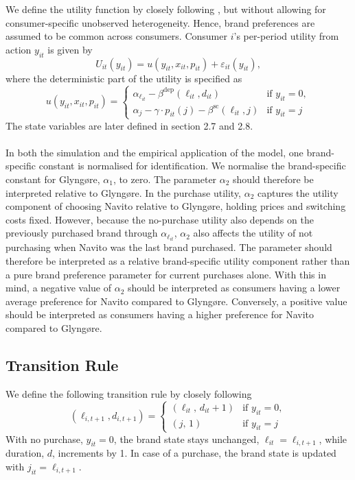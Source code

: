 We define the utility function by closely following \cite{Agu2023}, but without allowing for consumer-specific unobserved heterogeneity. Hence, brand preferences are assumed to be common across consumers. Consumer $i$'s per-period utility from action $y_{it}$ is given by
\begin{equation}
U_{it}(y_{it})
=
u(y_{it},x_{it},p_{it})
+
\varepsilon_{it}(y_{it}),
\end{equation}
where the deterministic part of the utility is specified as
\begin{equation}
u(y_{it},x_{it},p_{it})
=
\begin{cases} 
\alpha_{\ell_{it}}
-
\beta^{\text{dep}}(\ell_{it},d_{it})
& \text{if } y_{it}=0, \\[6pt]

\alpha_j
-
\gamma \cdot p_{it}(j)
-
\beta^{\text{sc}}(\ell_{it},j)
& \text{if } y_{it}=j
\end{cases}
\end{equation}
The state variables are later defined in section 2.7 and 2.8. 
\\
\\
In both the simulation and the empirical application of the model, one brand-specific constant is normalised for identification. We normalise the brand-specific constant for Glyngøre, $\alpha_1$, to zero. The parameter $\alpha_2$ should therefore be interpreted relative to Glyngøre. In the purchase utility, $\alpha_2$ captures the utility component of choosing Navito relative to Glyngøre, holding prices and switching costs fixed. However, because the no-purchase utility also depends on the previously purchased brand through $\alpha_{\ell_{it}}$, $\alpha_2$ also affects the utility of not purchasing when Navito was the last brand purchased. The parameter should therefore be interpreted as a relative brand-specific utility component rather than a pure brand preference parameter for current purchases alone. With this in mind, a negative value of $\alpha_2$ should be interpreted as consumers having a lower average preference for Navito compared to Glyngøre. Conversely, a positive value should be interpreted as consumers having a higher preference for Navito compared to Glyngøre. 

\subsection{Transition Rule}
We define the following transition rule by closely following \cite{Agu2023}
\[
(\ell_{i,t+1},d_{i,t+1})=
\begin{cases}
(\ell_{it},\,d_{it}+1) & \text{if } y_{it}=0,\\[2pt]
(j,\,1)                     & \text{if } y_{it}=j
\end{cases}
\]
With no purchase, $y_{it} = 0$, the brand state stays unchanged, $\ell_{it}=\ell_{i,t+1}$, while duration, $d$, increments by 1. In case of a purchase, the brand state is updated with $j_{it}=\ell_{i,t+1}$.



